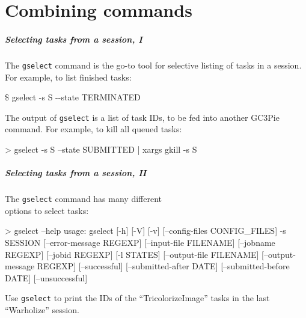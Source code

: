 \documentclass[english,serif,mathserif,xcolor=pdftex,dvipsnames,table]{beamer}
\begin{document}
\part{Combining commands}

\begin{frame}[fragile]
  \frametitle{Selecting tasks from a session, I}

  The \texttt{gselect} command is the go-to tool for selective listing
  of tasks in a session.  For example, to list finished tasks:
\begin{semiverbatim}
    \$ gselect -s S -{}-state TERMINATED
\end{semiverbatim}

  \+ The output of \texttt{gselect} is a list of task IDs, to be fed
  into another GC3Pie command.  For example, to kill all queued tasks:
  \begin{stdout}
    > gselect -s S --state SUBMITTED | xargs gkill -s S
  \end{stdout}
\end{frame}

\begin{frame}[fragile]
  \frametitle{Selecting tasks from a session, II}

  The \texttt{gselect} command has many different \\ options to select tasks:
  \begin{stdout}
> gselect --help
usage: gselect [-h] [-V] [-v] [--config-files CONFIG_FILES] -s SESSION
               [--error-message REGEXP] [--input-file FILENAME]
               [--jobname REGEXP] [--jobid REGEXP] [-l STATES]
               [--output-file FILENAME] [--output-message REGEXP]
               [--successful] [--submitted-after DATE]
               [--submitted-before DATE] [--unsuccessful]
  \end{stdout}

  \+
  \begin{exercise*}[3.B]
    Use \texttt{gselect} to print the IDs of the ``TricolorizeImage''
    tasks in the last ``Warholize'' session.
  \end{exercise*}
\end{frame}
\end{document}
